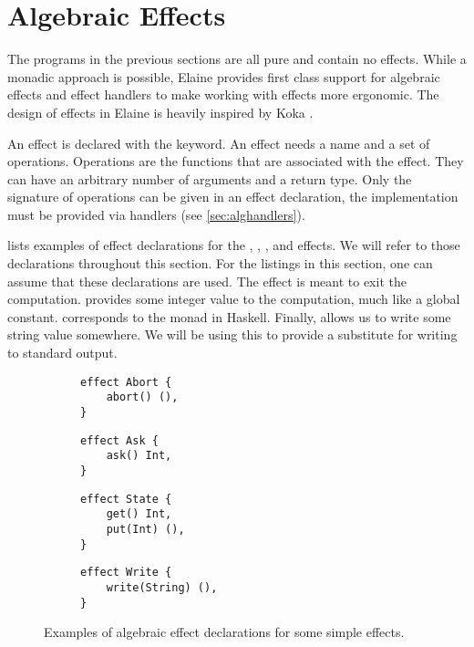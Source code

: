 \section{Algebraic Effects}

The programs in the previous sections are all pure and contain no effects. While a monadic approach is possible, Elaine provides first class support for algebraic effects and effect handlers to make working with effects more ergonomic. The design of effects in Elaine is heavily inspired by Koka \autocite{leijen_koka_2014}.

An effect is declared with the  keyword. An effect needs a name and a set of operations. Operations are the functions that are associated with the effect. They can have an arbitrary number of arguments and a return type. Only the signature of operations can be given in an effect declaration, the implementation must be provided via handlers (see \cref{sec:alghandlers}).

 lists examples of effect declarations for the , , , and  effects. We will refer to those declarations throughout this section. For the listings in this section, one can assume that these declarations are used. The  effect is meant to exit the computation.  provides some integer value to the computation, much like a global constant.  corresponds to the  monad in Haskell. Finally,  allows us to write some string value somewhere. We will be using this to provide a substitute for writing to standard output.

\begin{figure}[htbp]
    \begin{subfigure}{0.5\textwidth}
        \begin{lstlisting}[style=fancy]
effect Abort {
    abort() (),
}
        \end{lstlisting}
    \end{subfigure}
    \begin{subfigure}{0.5\textwidth}
        \begin{lstlisting}[style=fancy]
effect Ask {
    ask() Int,
}
        \end{lstlisting}
    \end{subfigure}
    \begin{subfigure}{0.5\textwidth}
        \begin{lstlisting}[style=fancy]
effect State {
    get() Int,
    put(Int) (),
}
        \end{lstlisting}
    \end{subfigure}
    \begin{subfigure}{0.5\textwidth}
        \begin{lstlisting}[style=fancy]
effect Write {
    write(String) (),
}

        \end{lstlisting}
    \end{subfigure}
    \caption{Examples of algebraic effect declarations for some simple effects.}
    \label{fig:effect_decls}
\end{figure}

